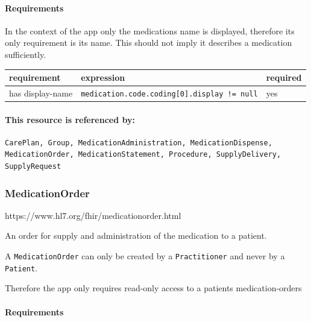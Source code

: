 \documentclass{article}
\begin{document}
\paragraph{Requirements}\label{res:medication:requirements}

In the context of the app only the medications name is
displayed, therefore its only requirement is its name.
This should not imply it describes a medication sufficiently.

\begin{longtable}[H]{@{}lll@{}}
\toprule
requirement & expression & required\tabularnewline
\midrule
has display-name & \texttt{medication.code.coding[0].display != null} & yes\tabularnewline
\bottomrule
\end{longtable}


\paragraph{This resource is referenced by:}\label{res:medication:referenced-by}

\begin{lstlisting}[breaklines]
CarePlan, Group, MedicationAdministration, MedicationDispense, MedicationOrder, MedicationStatement, Procedure, SupplyDelivery, SupplyRequest
\end{lstlisting}

\subsubsection{MedicationOrder}\label{res:medicationorder}

https://www.hl7.org/fhir/medicationorder.html

An order for supply and administration of the medication to a patient.

A \texttt{MedicationOrder} can only be created by a
\texttt{Practitioner} and never by a \texttt{Patient}.

Therefore the app only requires read-only access to a patients
medication-orders

\paragraph{Requirements}\label{res:medicationorder:requirements}
\end{document}
